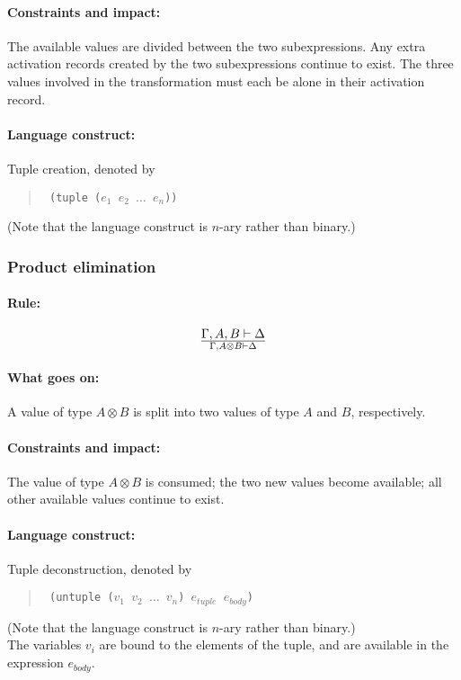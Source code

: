 \documentclass[a4paper]{article}
\begin{document}

\paragraph{Constraints and impact:} The available values are divided
between the two subexpressions.  Any extra activation records created
by the two subexpressions continue to exist.
The three values involved in the transformation must each be alone in
their activation record.

\paragraph{Language construct:} Tuple creation, denoted by
\begin{quote}\tt
  (tuple ($e_1$ $e_2$ $\ldots$ $e_n$))
\end{quote}
(Note that the language construct is $n$-ary rather than binary.)

\subsubsection{Product elimination}
\paragraph{Rule:}
$$
{
  \Gamma, A, B \vdash \Delta
}\over{
  \Gamma, A\otimes B \vdash \Delta
}
$$

\paragraph{What goes on:} A value of type $A \otimes B$ is split into two values of type $A$ and $B$, respectively.
\paragraph{Constraints and impact:} The value of type $A \otimes B$ is consumed; the two new values become available; all other available values continue to exist.
\paragraph{Language construct:} Tuple deconstruction, denoted by
\begin{quote}\tt
  (untuple ($v_1$ $v_2$ $\ldots$ $v_n$) $e_{tuple}$ $e_{body}$)
\end{quote}
(Note that the language construct is $n$-ary rather than binary.)\\
The variables $v_i$ are bound to the elements of the tuple, and are available in the expression $e_{body}$.
\end{document}
